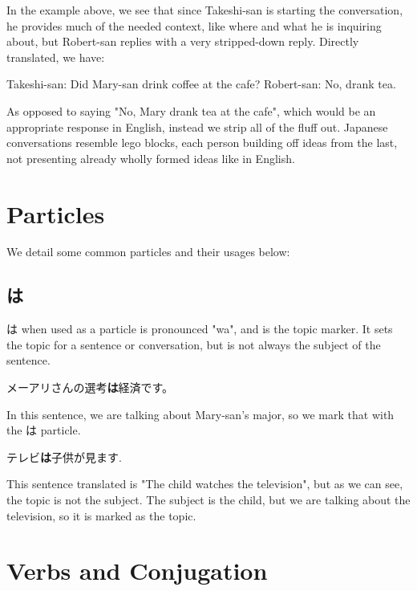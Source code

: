\documentclass{article}
\begin{document}
\begin{CJK}{UTF8}{min}
In the example above, we see that since Takeshi-san is starting the conversation, he provides much of the needed context, like where and what he is inquiring about, but Robert-san replies with a very stripped-down reply. Directly translated, we have:

\begin{example}
Takeshi-san: Did Mary-san drink coffee at the cafe?
Robert-san: No, drank tea.
\end{example}

As opposed to saying "No, Mary drank tea at the cafe", which would be an appropriate response in English, instead we strip all of the fluff out. Japanese conversations resemble lego blocks, each person building off ideas from the last, not presenting already wholly formed ideas like in English. 

\section{Particles}
We detail some common particles and their usages below:

\subsection{は}
は when used as a particle is pronounced "wa", and is the topic marker. It sets the topic for a sentence or conversation, but is not always the subject of the sentence. 

\begin{example}
メーアリさんの選考\textbf{は}経済です。
\end{example}

In this sentence, we are talking about Mary-san's major, so we mark that with the は particle.

\begin{example}
    テレビ\textbf{は}子供が見ます.
\end{example}
This sentence translated is "The child watches the television", but as we can see, the topic is not the subject. The subject is the child, but we are talking about the television, so it is marked as the topic. 

\section{Verbs and Conjugation}

\end{CJK}
\end{document}
